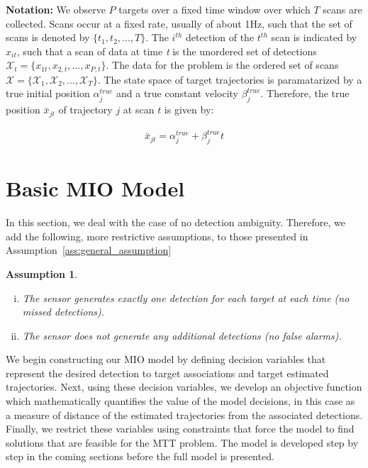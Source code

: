 \documentclass[journal]{IEEEtran}
\newtheorem{assumption}{Assumption}
\begin{document}
{\bf Notation:}
We observe $P$ targets over a fixed time window over which $T$ scans are collected. Scans occur at a fixed rate, usually of about 1Hz, such that the set of scans is denoted by $\{t_{1}, t_{2},...,T\}. $ The $i^{th}$ detection of the $t^{th}$ scan is indicated by $x_{it}$, such that a scan of data at time \textit{t} is the unordered set of detections $\mathcal{X}_{t} = \{x_{1t}, x_{2,t},...,x_{P,t}\}$. The data for the problem is the ordered set of scans $\boldsymbol{\mathcal{X}}=\{\mathcal{X}_{1},\mathcal{X}_{2},...,\mathcal{X}_{T}\}$. The state space of target trajectories is paramatarized by a true initial position $\alpha^{true}_{j}$ and a true constant velocity $\beta^{true}_{j}$. Therefore, the true position $\bar{x}_{jt}$ of trajectory $j$ at scan $t$ is given by: 

\begin{align}
	\bar{x}_{jt} = \alpha^{true}_{j} + \beta^{true}_{j}t
\end{align}

\section{Basic MIO Model}

In this section, we deal with the case of no detection ambiguity. Therefore, we add the following, more restrictive assumptions, to those presented in Assumption~\ref{ass:general_assumption}
\begin{assumption}\label{ass:basic_assumptions}
\begin{enumerate}[(i)]
\item The sensor generates exactly one detection for each target at each time (no missed detections).
\item The sensor does not generate any additional detections (no false alarms).
\end{enumerate}
\end{assumption}

We begin constructing our MIO model by defining decision variables that represent the desired detection to target associations and target estimated trajectories. Next, using these decision variables, we develop an objective function which mathematically quantifies the value of the model decisions, in this case as a measure of distance of the estimated trajectories from the associated detections. Finally, we restrict these variables using constraints that force the model to find solutions that are feasible for the MTT problem. The model is developed step by step in the coming sections before the full model is presented. 
\end{document}
